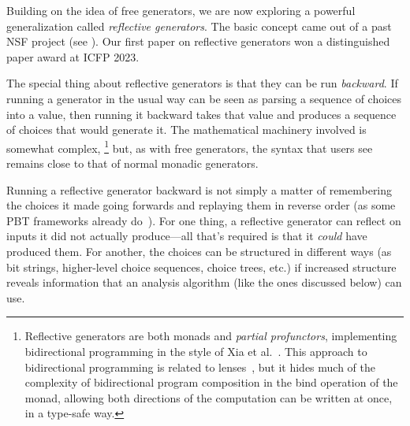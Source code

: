  Building on the
idea of free generators, we are now exploring a powerful
generalization called {\em reflective
  generators}.  The basic concept came out of a
past NSF project (see ). Our first paper on
reflective generators won a distinguished paper award at ICFP 2023.

The special thing about reflective generators is that they can be run
{\em backward}.
If running a generator in the usual way can be seen as parsing a
sequence of choices into a
value, then running it backward takes that value and produces a
sequence of choices that
would generate it.
The mathematical machinery
involved is somewhat complex,%
\footnote{\normalsize Reflective generators are both monads and {\em
    partial profunctors},
implementing bidirectional programming in the style of Xia et
al.~\cite{xia2019composing}. This approach to bidirectional programming is
related to lenses~\cite{foster2009bidirectional}, but it hides much of the
complexity of bidirectional program composition in the bind operation of the
monad, allowing both directions of
the computation can be written at once, in a type-safe way.}
but, as with free generators, the syntax that users see remains close to
that of normal monadic generators.

Running a reflective generator backward is not simply a matter of
remembering the choices it made going forwards and replaying them in
reverse order (as some PBT frameworks already do~\cite{maciver2019hypothesis,
  hatfield-dodds_hypofuzz_nodate}). For one thing, a reflective
generator can reflect on inputs it did not actually
produce---all that's required is that it {\em could} have produced
them.  For another, the choices can be structured in different ways (as bit
strings, higher-level choice sequences, choice trees, etc.) if increased
structure reveals information that an analysis algorithm (like the ones
discussed below) can use. \iflater{}\fi{}

